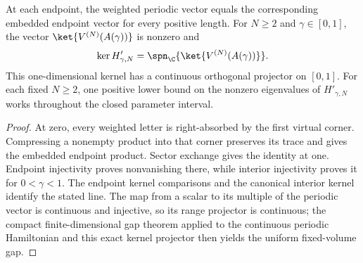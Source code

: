 \begin{lemma}
    \label{thm:mpo_mixed_periodic_line_continuity}
    \leanok
    At each endpoint, the weighted periodic vector equals the
    corresponding embedded endpoint vector for every positive length.
    For $N\geq2$ and $\gamma\in[0,1]$, the vector
    $\ket{V^{(N)}(A(\gamma))}$ is nonzero and
    \begin{align}
        \ker H'_{\gamma,N}
        =\spn_{\C}\{\ket{V^{(N)}(A(\gamma))}\}.
    \end{align}
    This one-dimensional kernel has a continuous orthogonal projector
    on $[0,1]$.
    For each fixed $N\geq2$, one positive lower bound on the nonzero
    eigenvalues of $H'_{\gamma,N}$ works throughout the closed parameter
    interval.
\end{lemma}
\begin{proof}
    \leanok
    At zero, every weighted letter is right-absorbed by the first
    virtual corner. Compressing a nonempty product into that corner
    preserves its trace and gives the embedded endpoint product.
    Sector exchange gives the identity at one. Endpoint injectivity
    proves nonvanishing there, while interior injectivity proves it
    for $0<\gamma<1$. The endpoint kernel comparisons and the
    canonical interior kernel identify the stated line.
    The map from a scalar to its multiple of the periodic
    vector is continuous and injective, so its range projector is
    continuous; the compact finite-dimensional gap
    theorem applied to the continuous periodic Hamiltonian and this exact
    kernel projector then yields the uniform fixed-volume gap.
\end{proof}

